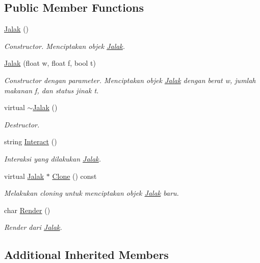 \subsection*{Public Member Functions}
\begin{DoxyCompactItemize}
\item 
\hyperlink{classJalak_a3887e1118830188e1aeffee215b2816f}{Jalak} ()
\begin{DoxyCompactList}\small\item\em Constructor. Menciptakan objek \hyperlink{classJalak}{Jalak}. \end{DoxyCompactList}\item 
\hyperlink{classJalak_a12f97db5ae28b059a948c7f52f5eb002}{Jalak} (float w, float f, bool t)
\begin{DoxyCompactList}\small\item\em Constructor dengan parameter. Menciptakan objek \hyperlink{classJalak}{Jalak} dengan berat w, jumlah makanan f, dan status jinak t. \end{DoxyCompactList}\item 
virtual \hyperlink{classJalak_a2c1e4e68ab9126c034520c2c845a5afa}{$\sim$\+Jalak} ()
\begin{DoxyCompactList}\small\item\em Destructor. \end{DoxyCompactList}\item 
string \hyperlink{classJalak_a864b931f04f1580759c4a108e1734bb8}{Interact} ()
\begin{DoxyCompactList}\small\item\em Interaksi yang dilakukan \hyperlink{classJalak}{Jalak}. \end{DoxyCompactList}\item 
virtual \hyperlink{classJalak}{Jalak} $\ast$ \hyperlink{classJalak_a85b145221386cdca75274b4438250161}{Clone} () const 
\begin{DoxyCompactList}\small\item\em Melakukan cloning untuk menciptakan objek \hyperlink{classJalak}{Jalak} baru. \end{DoxyCompactList}\item 
char \hyperlink{classJalak_af500189104401b66d6ab4e3b1106ce74}{Render} ()
\begin{DoxyCompactList}\small\item\em Render dari \hyperlink{classJalak}{Jalak}. \end{DoxyCompactList}\end{DoxyCompactItemize}
\subsection*{Additional Inherited Members}


